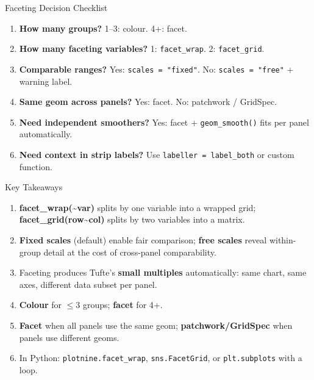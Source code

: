 \documentclass[10pt]{beamer}
\begin{document}
\begin{frame}{Faceting Decision Checklist}
  \begin{enumerate}
    \item \textbf{How many groups?} 1--3: colour. 4+: facet.
    \item \textbf{How many faceting variables?} 1: \texttt{facet\_wrap}.
          2: \texttt{facet\_grid}.
    \item \textbf{Comparable ranges?} Yes: \texttt{scales = "fixed"}.
          No: \texttt{scales = "free"} + warning label.
    \item \textbf{Same geom across panels?} Yes: facet.
          No: patchwork / GridSpec.
    \item \textbf{Need independent smoothers?} Yes: facet +
          \texttt{geom\_smooth()} fits per panel automatically.
    \item \textbf{Need context in strip labels?} Use
          \texttt{labeller = label\_both} or custom function.
  \end{enumerate}
\end{frame}

\begin{frame}{Key Takeaways}
  \begin{enumerate}
    \item \textbf{facet\_wrap(\textasciitilde{}var)} splits by one variable into a
          wrapped grid; \textbf{facet\_grid(row\textasciitilde{}col)} splits by two
          variables into a matrix.
    \item \textbf{Fixed scales} (default) enable fair comparison;
          \textbf{free scales} reveal within-group detail at the cost of
          cross-panel comparability.
    \item Faceting produces Tufte's \textbf{small multiples} automatically:
          same chart, same axes, different data subset per panel.
    \item \textbf{Colour} for $\leq$3 groups; \textbf{facet} for 4+.
    \item \textbf{Facet} when all panels use the same geom;
          \textbf{patchwork/GridSpec} when panels use different geoms.
    \item In Python: \texttt{plotnine.facet\_wrap}, \texttt{sns.FacetGrid},
          or \texttt{plt.subplots} with a loop.
  \end{enumerate}
\end{frame}
\end{document}
